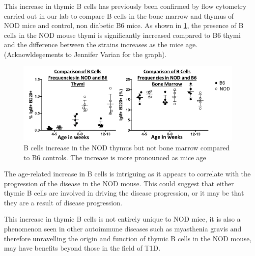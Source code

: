 
This increase in thymic B cells has previously been confirmed by flow cytometry carried out in our lab to compare B cells in the bone marrow and thymus of NOD mice and control, non diabetic B6 mice.
As shown in \cref{fig:JVgraph}, the presence of B cells in the NOD mouse thymi is significantly increased compared to B6 thymi and the difference between the strains increases as the mice age. (Acknowldegements to Jennifer Varian for the graph).

\begin{figure}
\includegraphics[width=\textwidth]{Figures/JVgraph.pdf}
\caption{B cells increase in the NOD thymus but not bone marrow compared to B6 controls.
The increase is more pronounced as mice age}
\label{fig:JVgraph}
\end{figure}

The age-related increase in B cells is intriguing as it appears to correlate with the progression of the disease in the NOD mouse.
This could suggest that either thymic B cells are involved in driving the disease progression, or it may be that they are a result of disease progression.

This increase in thymic B cells is not entirely unique to NOD mice, it is also a phenomenon seen in other autoimmune diseases such as myasthenia gravis \citep{Vrolix2014, Christensson1988} and therefore unravelling the origin and function of thymic B cells in the NOD mouse, may have benefits beyond those in the field of T1D.


